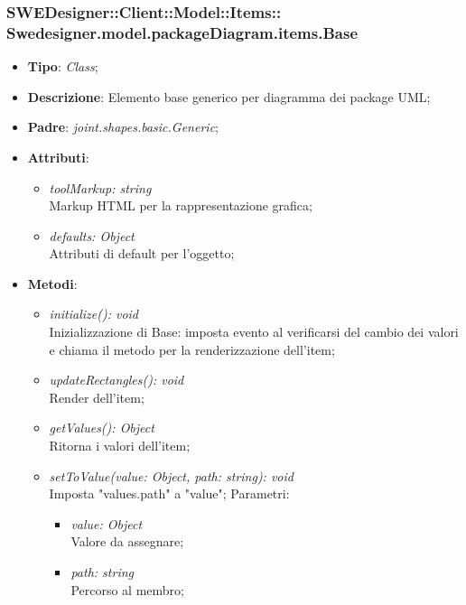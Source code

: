 \documentclass[../DefinizioneDiProdotto.tex]{subfiles}
\begin{document}
			\subsubsection[Swedesigner.model.packageDiagram.items.Base]{SWEDesigner::Client::Model::Items::\\Swedesigner.model.packageDiagram.items.Base}
			\hypertarget{SWEDesigner::Client::Model::Items::Swedesigner.model.packageDiagram.items.Base}{}
			\begin{itemize}
				\item \textbf{Tipo}: \emph{Class};
				\item \textbf{Descrizione}: Elemento base generico per diagramma dei package UML;
				\item \textbf{Padre}: \emph{joint.shapes.basic.Generic};
				\item \textbf{Attributi}:
				\begin{itemize}
					\item \emph{toolMarkup: string}\\
					Markup HTML per la rappresentazione grafica;
					\item \emph{defaults: Object}\\
					Attributi di default per l'oggetto;
				\end{itemize}
				\item \textbf{Metodi}:
				\begin{itemize}
					\item \emph{initialize(): void}\\
					Inizializzazione di Base: imposta evento al verificarsi del cambio dei valori e chiama il metodo per la renderizzazione dell'item;
					\item \emph{updateRectangles(): void}\\
					Render dell'item;
					\item \emph{getValues(): Object}\\
					Ritorna i valori dell'item;
					\item \emph{setToValue(value: Object, path: string): void}\\
					Imposta "values.path" a "value";
					Parametri:
					\begin{itemize}
						\item \emph{value: Object} \\
						Valore da assegnare;
						\item \emph{path: string} \\
						Percorso al membro;
					\end{itemize}
				\end{itemize}
			\end{itemize}
			
\end{document}
